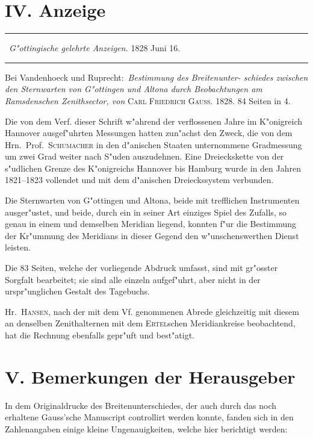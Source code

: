 \documentclass[12pt,a4paper]{article}
\theoremstyle{plain}
\theoremstyle{definition}
\theoremstyle{remark}
\begin{document}
\newpage

\part*{IV. Anzeige}

\begin{center}
\rule{0.5\textwidth}{0.4pt}\
\textit{G"ottingische gelehrte Anzeigen.} 1828 Juni 16.\
\rule{0.5\textwidth}{0.4pt}
\end{center}

Bei Vandenhoeck und Ruprecht:\ \textit{Bestimmung des Breitenunter-
schiedes zwischen den Sternwarten von G"ottingen und Altona durch Beobachtungen am Ramsdenschen Zenithsector, von} \textsc{Carl Friedrich Gauss}. 1828. 84 Seiten in 4.

Die von dem Verf. dieser Schrift w"ahrend der verflossenen Jahre im K"onigreich Hannover ausgef"uhrten Messungen hatten zun"achst den Zweck, die von dem Hrn.~Prof.~\textsc{Schumacher} in den d"anischen Staaten unternommene Gradmessung um zwei Grad weiter nach S"uden auszudehnen. Eine Dreieckskette von der s"udlichen Grenze des K"onigreichs Hannover bis Hamburg wurde in den Jahren 1821--1823 vollendet und mit dem d"anischen Dreieckssystem verbunden.

Die Sternwarten von G"ottingen und Altona, beide mit trefflichen Instrumenten ausger"ustet, und beide, durch ein in seiner Art einziges Spiel des Zufalls, so genau in einem und demselben Meridian liegend, konnten f"ur die Bestimmung der Kr"ummung des Meridians in dieser Gegend den w"unschenswerthen Dienst leisten.

Die 83 Seiten, welche der vorliegende Abdruck umfasst, sind mit gr"osster Sorgfalt bearbeitet; sie sind alle einzeln aufgef"uhrt, aber nicht in der urspr"unglichen Gestalt des Tagebuchs.

Hr.~\textsc{Hansen}, nach der mit dem Vf. genommenen Abrede gleichzeitig mit diesem an denselben Zenithalternen mit dem \textsc{Ertel}schen Meridiankreise beobachtend, hat die Rechnung ebenfalls gepr"uft und best"atigt.

\newpage

\part*{V. Bemerkungen der Herausgeber}

In dem Originaldrucke des Breitenunterschiedes, der auch durch das
noch erhaltene Gauss'sche Manuscript controllirt werden konnte, fanden
sich in den Zahlenangaben einige kleine Ungenauigkeiten, welche hier
berichtigt werden:
\end{document}
